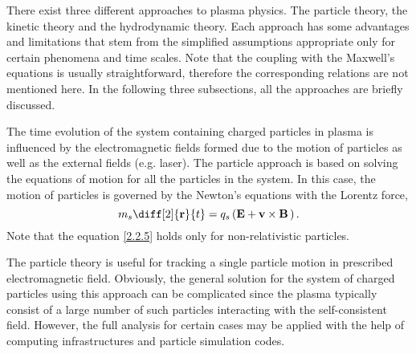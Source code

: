 There exist three different approaches to plasma physics. The particle theory, the kinetic theory and the hydrodynamic theory. Each approach has some advantages and limitations that stem from the simplified assumptions appropriate only for certain phenomena and time scales. Note that the coupling with the Maxwell's equations is usually straightforward, therefore the corresponding relations are not mentioned here. In the following three subsections, all the approaches are briefly discussed. 

The time evolution of the system containing charged particles in plasma is influenced by the electromagnetic fields formed due to the motion of particles as well as the external fields (e.g. laser). The particle approach is based on solving the equations of motion for all the particles in the system. In this case, the motion of particles is governed by the Newton's equations with the Lorentz force,
\begin{equation}
\label{2.2.5}
m_s \diff[2]{\vec{r}}{t} = q_s \left(\vec{E} + \vec{v} \times \vec{B} \, \right).
\end{equation}
Note that the equation \ref{2.2.5} holds only for non-relativistic particles.

The particle theory is useful for tracking a single particle motion in prescribed electromagnetic field. Obviously, the general solution for the system of charged particles using this approach can be complicated since the plasma typically consist of a large number of such particles interacting with the self-consistent field. However, the full analysis for certain cases may be applied with the help of computing infrastructures and particle simulation codes.

